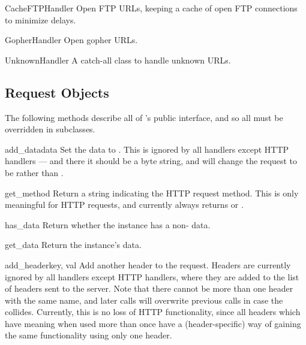 \begin{classdesc}{CacheFTPHandler}{}
Open FTP URLs, keeping a cache of open FTP connections to minimize
delays.
\end{classdesc}

\begin{classdesc}{GopherHandler}{}
Open gopher URLs.
\end{classdesc}

\begin{classdesc}{UnknownHandler}{}
A catch-all class to handle unknown URLs.
\end{classdesc}


\subsection{Request Objects \label{request-objects}}

The following methods describe all of 's public interface,
and so all must be overridden in subclasses.

\begin{methoddesc}[Request]{add_data}{data}
Set the  data to .  This is ignored by all
handlers except HTTP handlers --- and there it should be a byte
string, and will change the request to be  rather than
.
\end{methoddesc}

\begin{methoddesc}[Request]{get_method}{}
Return a string indicating the HTTP request method.  This is only
meaningful for HTTP requests, and currently always returns
 or .
\end{methoddesc}

\begin{methoddesc}[Request]{has_data}{}
Return whether the instance has a non- data.
\end{methoddesc}

\begin{methoddesc}[Request]{get_data}{}
Return the instance's data.
\end{methoddesc}

\begin{methoddesc}[Request]{add_header}{key, val}
Add another header to the request.  Headers are currently ignored by
all handlers except HTTP handlers, where they are added to the list
of headers sent to the server.  Note that there cannot be more than
one header with the same name, and later calls will overwrite
previous calls in case the  collides.  Currently, this is
no loss of HTTP functionality, since all headers which have meaning
when used more than once have a (header-specific) way of gaining the
same functionality using only one header.
\end{methoddesc}

